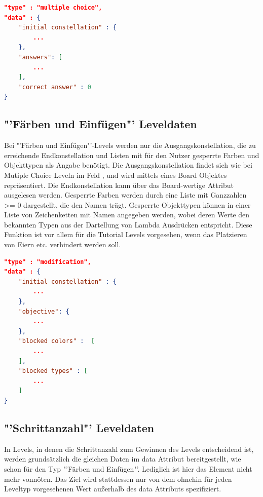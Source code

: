 \begin{lstlisting}[language=json,caption={Grober Aufbau des data Attributs eines Multiple Choice Levels}]
"type" : "multiple choice",
"data" : {
	"initial constellation" : {
		...
	},
	"answers": [
		...
	],
	"correct answer" : 0
}
\end{lstlisting}

\subsection{"'Färben und Einfügen"' Leveldaten}
Bei "'Färben und Einfügen"'-Levels werden nur die Ausgangskonstellation, die zu erreichende Endkonstellation und Listen mit für den Nutzer gesperrte Farben und Objekttypen als Angabe benötigt.
Die Ausgangskonstellation findet sich wie bei Mutiple Choice Leveln im Feld , und wird mittels eines Board Objektes repräsentiert.
Die Endkonstellation kann über das Board-wertige Attribut  ausgelesen werden.
Gesperrte Farben werden durch eine Liste mit Ganzzahlen >= 0 dargestellt, die den Namen  trägt.
Gesperrte Objekttypen können in einer Liste von Zeichenketten mit Namen  angegeben werden, wobei deren Werte den bekannten Typen aus der Dartellung von Lambda Ausdrücken entspricht.
Diese Funktion ist vor allem für die Tutorial Levels vorgesehen, wenn das Platzieren von Eiern etc. verhindert werden soll.

\begin{lstlisting}[language=json,caption={Grober Aufbau des data Attributs eines "'Färben und Einfügen"' Levels}]
"type" : "modification",
"data" : {
	"initial constellation" : {
		...
	},
	"objective": {
		...
	},
	"blocked colors" :  [
		...
	],
	"blocked types" : [
		...
	]
}
\end{lstlisting}

\subsection{"'Schrittanzahl"' Leveldaten}
In Levels, in denen die Schrittanzahl zum Gewinnen des Levels entscheidend ist, werden grundsätzlich die gleichen Daten im data Attribut bereitgestellt, wie schon für den Typ "'Färben und Einfügen"'.
Lediglich ist hier das Element  nicht mehr vonnöten.
Das Ziel wird stattdessen nur von dem ohnehin für jeden Leveltyp vorgesehenen Wert  außerhalb des data Attributs spezifiziert.

